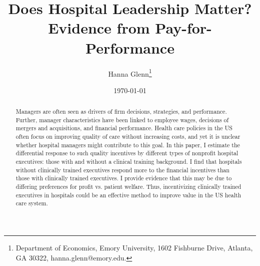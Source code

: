 \documentclass[12pt]{article}
\begin{document}
	
	
	
	
	\linespread{1.2}\title{\vspace{-0.5in} Does Hospital Leadership Matter?\\ \large Evidence from Pay-for-Performance} 
	
	\date{\today}
	
	\author{\vspace{10mm}Hanna Glenn\footnote{Department of Economics, Emory University, 1602 Fishburne Drive, Atlanta, GA 30322, hanna.glenn@emory.edu.} }
	
	\maketitle
	
	\vspace{-0.2in}
	
	\singlespacing\maketitle


 \vspace{3mm}
	
    \begin{abstract}
		{\small
         Managers are often seen as drivers of firm decisions, strategies, and performance. Further, manager characteristics have been linked to employee wages, decisions of mergers and acquisitions, and financial performance. Health care policies in the US often focus on improving quality of care without increasing costs, and yet it is unclear whether hospital managers might contribute to this goal. In this paper, I estimate the differential response to such quality incentives by different types of nonprofit hospital executives: those with and without a clinical training background. I find that hospitals without clinically trained executives respond more to the financial incentives than those with clinically trained executives. I provide evidence that this may be due to differing preferences for profit vs. patient welfare. Thus, incentivizing clinically trained executives in hospitals could be an effective method to improve value in the US health care system. 
		} 
	\end{abstract}
	
	
	
	
	

	
	\onehalfspacing
	
\end{document}
